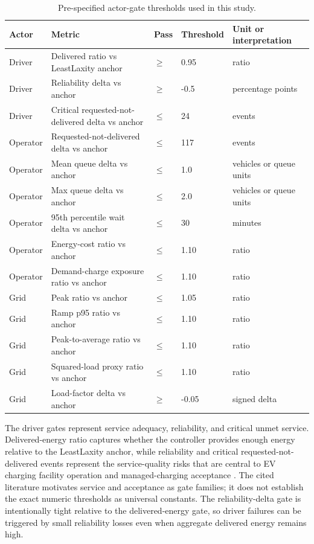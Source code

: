 \documentclass[12pt]{article}
\begin{document}
\begin{table}[t]
\centering
\caption{Pre-specified actor-gate thresholds used in this study.}
\label{tab:gates}
\scriptsize
\begin{tabularx}{\textwidth}{p{}Yp{0.13\textwidth}p{0.14\textwidth}Y}
\hline
Actor & Metric & Pass & Threshold & Unit or interpretation \\
\hline
Driver & Delivered ratio vs LeastLaxity anchor & $\geq$ & 0.95 & ratio \\
Driver & Reliability delta vs anchor & $\geq$ & -0.5 & percentage points \\
Driver & Critical requested-not-delivered delta vs anchor & $\leq$ & 24 & events \\
Operator & Requested-not-delivered delta vs anchor & $\leq$ & 117 & events \\
Operator & Mean queue delta vs anchor & $\leq$ & 1.0 & vehicles or queue units \\
Operator & Max queue delta vs anchor & $\leq$ & 2.0 & vehicles or queue units \\
Operator & 95th percentile wait delta vs anchor & $\leq$ & 30 & minutes \\
Operator & Energy-cost ratio vs anchor & $\leq$ & 1.10 & ratio \\
Operator & Demand-charge exposure ratio vs anchor & $\leq$ & 1.10 & ratio \\
Grid & Peak ratio vs anchor & $\leq$ & 1.05 & ratio \\
Grid & Ramp p95 ratio vs anchor & $\leq$ & 1.10 & ratio \\
Grid & Peak-to-average ratio vs anchor & $\leq$ & 1.10 & ratio \\
Grid & Squared-load proxy ratio vs anchor & $\leq$ & 1.10 & ratio \\
Grid & Load-factor delta vs anchor & $\geq$ & -0.05 & signed delta \\
\hline
\end{tabularx}
\end{table}

The driver gates represent service adequacy, reliability, and critical unmet service. Delivered-energy ratio captures whether the controller provides enough energy relative to the LeastLaxity anchor, while reliability and critical requested-not-delivered events represent the service-quality risks that are central to EV charging facility operation \cite{woo2021,danner2021} and managed-charging acceptance \cite{will2016,bailey2015,schmalfuss2015,delmonte2020,tarroja2021}. The cited literature motivates service and acceptance as gate families; it does not establish the exact numeric thresholds as universal constants. The reliability-delta gate is intentionally tight relative to the delivered-energy gate, so driver failures can be triggered by small reliability losses even when aggregate delivered energy remains high.
\end{document}

